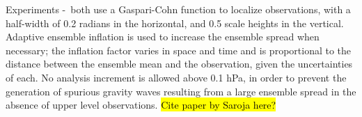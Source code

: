 Experiments \WACCMTROPICS-\WACCMGLOBAL~both use a Gaspari-Cohn function \citep{Gaspari1999} to localize observations, with a half-width of 0.2 radians in the horizontal, and 0.5 scale heights in the vertical.  
Adaptive ensemble inflation \citep{Anderson2009tellus} is used to increase the ensemble spread when necessary; the inflation factor varies in space and time and is proportional to the distance between the ensemble mean and the observation, given the uncertainties of each.  
No analysis increment is allowed above 0.1 hPa, in order to prevent the generation of spurious gravity waves resulting from a large ensemble spread in the absence of upper level observations. 
\hl{Cite paper by Saroja here?}



